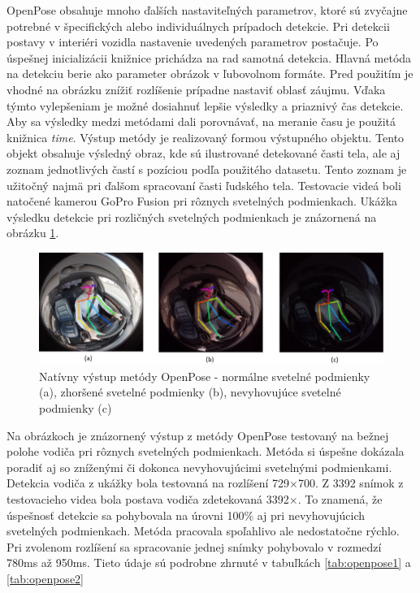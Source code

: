 \documentclass[slovak,master,dept460,male,cpp,cpdeclaration]{diploma}
\begin{document}
OpenPose obsahuje mnoho ďalších nastaviteľných parametrov, ktoré  sú zvyčajne potrebné v špecifických alebo individuálnych prípadoch detekcie. Pri detekcii postavy v interiéri vozidla nastavenie uvedených parametrov postačuje. Po úspešnej inicializácii knižnice prichádza na rad samotná detekcia.  Hlavná metóda na detekciu berie  ako parameter  obrázok v ľubovolnom formáte. Pred použitím je vhodné  na obrázku  znížiť rozlíšenie prípadne  nastaviť oblasť záujmu. Vďaka týmto vylepšeniam je možné dosiahnuť lepšie výsledky  a priaznivý čas detekcie. Aby sa výsledky  medzi metódami dali porovnávať, na meranie času je použitá knižnica \textit{time}. Výstup metódy je realizovaný formou výstupného objektu. Tento objekt obsahuje výsledný obraz, kde sú ilustrované detekované časti tela, ale aj zoznam jednotlivých častí s pozíciou podľa použitého datasetu. Tento zoznam je užitočný najmä pri  ďalšom spracovaní časti ľudského tela. Testovacie videá boli  natočené kamerou GoPro Fusion pri rôznych svetelných podmienkach. Ukážka výsledku detekcie pri rozličných  svetelných podmienkach je  znázornená na  obrázku \ref{fig:op_result}.

\begin{figure}[H]
	\centering
	\includegraphics[width=1\textwidth]{Figures/op_result.png}
	\caption{Natívny výstup metódy OpenPose - normálne svetelné podmienky (a), zhoršené svetelné podmienky (b), nevyhovujúce svetelné podmienky (c)}
	\label{fig:op_result}
\end{figure}

Na obrázkoch je znázornený výstup  z metódy OpenPose testovaný na bežnej polohe vodiča pri rôznych svetelných podmienkach. Metóda si úspešne dokázala poradiť aj so zníženými či dokonca nevyhovujúcimi svetelnými podmienkami. Detekcia vodiča z ukážky bola testovaná na rozlíšení 729$\times$700. Z 3392 snímok z testovacieho videa bola postava vodiča zdetekovaná  3392$\times$. To znamená, že úspešnosť detekcie sa pohybovala na úrovni 100\% aj pri nevyhovujúcich svetelných podmienkach. Metóda pracovala spoľahlivo ale nedostatočne rýchlo. Pri zvolenom rozlíšení sa spracovanie jednej snímky pohybovalo v rozmedzí 780ms až 950ms. Tieto údaje sú podrobne zhrnuté v tabuľkách \ref{tab:openpose1} a \ref{tab:openpose2}
\end{document}
